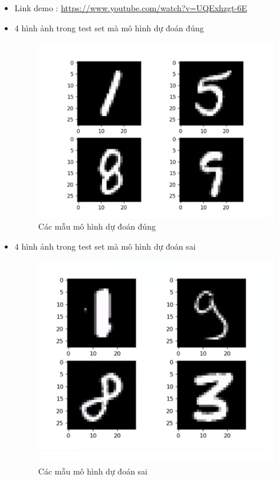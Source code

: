\begin{itemize}
    \item Link demo \cite{demo}: \href{https://www.youtube.com/watch?v=UQExhzgt-6E}{https://www.youtube.com/watch?v=UQExhzgt-6E} 
    \newpage
    \item 4 hình ảnh trong test set mà mô hình dự đoán đúng
    \begin{figure}[H]
    \centering
    \includegraphics[width=0.65\linewidth]{true.png}
    \caption{Các mẫu mô hình dự đoán đúng}
        
    \end{figure}
    \item 4 hình ảnh trong test set mà mô hình dự đoán sai
    \begin{figure}[H]
    \centering
    \includegraphics[width=0.65\linewidth]{img/false.png}
    \caption{Các mẫu mô hình dự đoán sai}
\end{figure}
\end{itemize}

